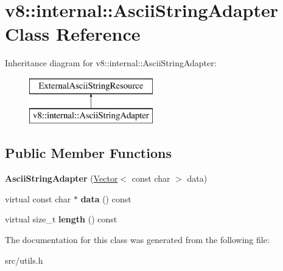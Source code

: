 \hypertarget{classv8_1_1internal_1_1_ascii_string_adapter}{}\section{v8\+:\+:internal\+:\+:Ascii\+String\+Adapter Class Reference}
\label{classv8_1_1internal_1_1_ascii_string_adapter}
Inheritance diagram for v8\+:\+:internal\+:\+:Ascii\+String\+Adapter\+:\begin{figure}[H]
\begin{center}
\leavevmode
\includegraphics[height=2.000000cm]{classv8_1_1internal_1_1_ascii_string_adapter}
\end{center}
\end{figure}
\subsection*{Public Member Functions}
\begin{DoxyCompactItemize}
\item 
\hypertarget{classv8_1_1internal_1_1_ascii_string_adapter_a4d3a708be36d7605118f215633a9dd79}{}{\bfseries Ascii\+String\+Adapter} (\hyperlink{classv8_1_1internal_1_1_vector}{Vector}$<$ const char $>$ data)\label{classv8_1_1internal_1_1_ascii_string_adapter_a4d3a708be36d7605118f215633a9dd79}

\item 
\hypertarget{classv8_1_1internal_1_1_ascii_string_adapter_a0a6d9e189adfd85bab3480279012c225}{}virtual const char $\ast$ {\bfseries data} () const \label{classv8_1_1internal_1_1_ascii_string_adapter_a0a6d9e189adfd85bab3480279012c225}

\item 
\hypertarget{classv8_1_1internal_1_1_ascii_string_adapter_a5c08984324c9d18fbb5bdb802e5f9b90}{}virtual size\+\_\+t {\bfseries length} () const \label{classv8_1_1internal_1_1_ascii_string_adapter_a5c08984324c9d18fbb5bdb802e5f9b90}

\end{DoxyCompactItemize}


The documentation for this class was generated from the following file\+:\begin{DoxyCompactItemize}
\item 
src/utils.\+h\end{DoxyCompactItemize}
